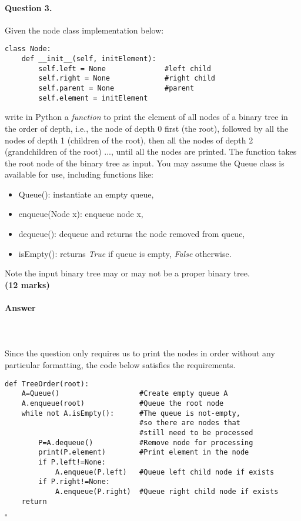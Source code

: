 \documentclass[12pt]{article}
\newcommand{\EOQ}{\hfill $\square$}
\begin{document}
\paragraph{Question 3.} Given the node class implementation below:
\begin{verbatim}
class Node:
    def __init__(self, initElement):
        self.left = None              #left child
        self.right = None             #right child
        self.parent = None            #parent
        self.element = initElement
\end{verbatim}
write in Python a \textit{function} to print the element of all nodes of a binary tree in the order of depth, i.e., the node of depth 0 first (the root), followed by all the nodes of depth 1 (children of the root), then all the nodes of depth 2 (grandchildren of the root) ..., until all the nodes are printed. The function takes the root node of the binary tree as input. You may assume the Queue class is available for use, including functions like:
\begin{itemize}
\item Queue(): instantiate an empty queue,
\item enqueue(Node x): enqueue node x,
\item dequeue(): dequeue and returns the node removed from queue,
\item isEmpty(): returns \textit{True} if queue is empty, \textit{False} otherwise.
\end{itemize}
Note the input binary tree may or may not be a proper binary tree. \\\text{}\hfill \textbf{(12 marks)}
\paragraph{Answer}\mbox{}\\\\
Since the question only requires us to print the nodes in order without any particular formatting, the code below satisfies the requirements.\\
\begin{verbatim}
def TreeOrder(root):
    A=Queue()                   #Create empty queue A
    A.enqueue(root)             #Queue the root node
    while not A.isEmpty():      #The queue is not-empty,
                                #so there are nodes that 
                                #still need to be processed
        P=A.dequeue()           #Remove node for processing
        print(P.element)        #Print element in the node
        if P.left!=None:         
            A.enqueue(P.left)   #Queue left child node if exists
        if P.right!=None:        
            A.enqueue(P.right)  #Queue right child node if exists
    return
\end{verbatim}
\EOQ
\end{document}
